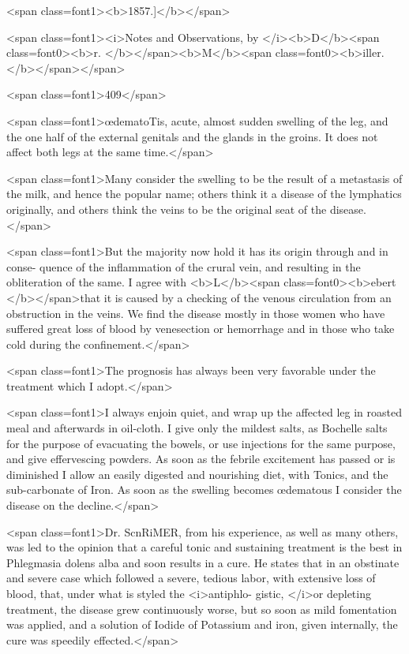 <span class=font1><b>1857.]</b></span>

<span class=font1><i>Notes and Observations, by </i><b>D</b><span class=font0><b>r. </b></span><b>M</b><span class=font0><b>iller.</b></span></span>

<span class=font1>409</span>

<span class=font1>œdematoTis, acute, almost sudden swelling of the leg, and the one half
of the external genitals and the glands in the groins. It does not
affect both legs at the same time.</span>

<span class=font1>Many consider the swelling to be the result of a metastasis of the
milk, and hence the popular name; others think it a disease of the
lymphatics originally, and others think the veins to be the original
seat of the disease.</span>

<span class=font1>But the majority now hold it has its origin through and in conse-
quence of the inflammation of the crural vein, and resulting in the
obliteration of the same. I agree with <b>L</b><span class=font0><b>ebert </b></span>that it is caused by a
checking of the venous circulation from an obstruction in the veins.
We find the disease mostly in those women who have suffered great
loss of blood by venesection or hemorrhage and in those who take cold
during the confinement.</span>

<span class=font1>The prognosis has always been very favorable under the treatment
which I adopt.</span>

<span class=font1>I always enjoin quiet, and wrap up the affected leg in roasted meal
and afterwards in oil-cloth. I give only the mildest salts, as Bochelle
salts for the purpose of evacuating the bowels, or use injections for
the same purpose, and give effervescing powders. As soon as the
febrile excitement has passed or is diminished I allow an easily digested
and nourishing diet, with Tonics, and the sub-carbonate of Iron. As
soon as the swelling becomes œdematous I consider the disease on the
decline.</span>

<span class=font1>Dr. ScnRiMER, from his experience, as well as many others, was led
to the opinion that a careful tonic and sustaining treatment is the best
in Phlegmasia dolens alba and soon results in a cure. He states that
in an obstinate and severe case which followed a severe, tedious labor,
with extensive loss of blood, that, under what is styled the <i>antiphlo-
gistic, </i>or depleting treatment, the disease grew continuously worse, but
so soon as mild fomentation was applied, and a solution of Iodide of
Potassium and iron, given internally, the cure was speedily effected.</span>

